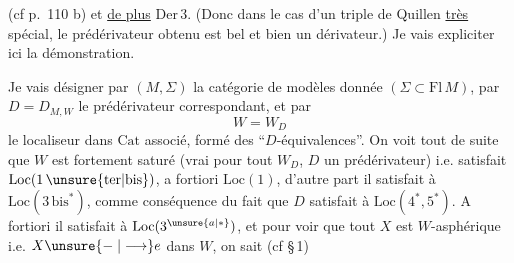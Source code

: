 (cf p.~110  b) et \uline{de plus} $\mathrm{Der}\,3$. (Donc dans le cas d'un triple de Quillen \uline{très} spécial, le prédérivateur obtenu est bel et bien un dérivateur.) Je vais expliciter ici la démonstration.

 Je vais désigner par $(M,\Sigma)$ la catégorie de modèles donnée $(\Sigma\subset\mathrm{Fl}\,M)$,  par $D=D_{M,W}$ le prédérivateur correspondant, et par
\[
W=W_D
\]
le localiseur dans $\mathrm{Cat}$ associé, formé des ``$D$-équivalences''. On voit tout de suite que $W$ est fortement saturé (vrai pour tout $W_D$, $D$ un prédérivateur) i.e. satisfait $\mathrm{Loc}(1\,\unsure{\mathrm{ter}|\mathrm{bis}})$, a fortiori $\mathrm{Loc}(1)$, d'autre part il satisfait à $\mathrm{Loc}(3\,\mathrm{bis}^*)$, comme conséquence du fait que $D$ satisfait à $\mathrm{Loc}(4^*,5^*)$. A fortiori il satisfait à $\mathrm{Loc}(3^{\unsure{a|*}})$, et pour voir que tout $X$   est $W$-asphérique i.e. $X\unsure{\relbar|\longrightarrow}e$ dans $W$, on sait (cf \S\,1)
